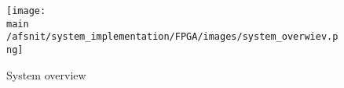 \documentclass[../../../main]{subfiles}
\begin{document}
\begin{figure}[H]
    \texttt{[image: \\main /afsnit/system\_implementation/FPGA/images/system\_overwiev.png]}
    \caption {System overview}
    \label{fig:system_overview_FPGA}
\end{figure}
\end{document}
